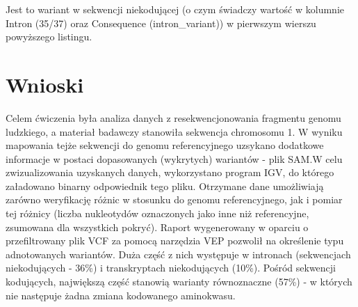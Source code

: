 \documentclass[a4paper]{article}
\begin{document}
Jest to wariant w sekwencji niekodującej (o czym świadczy wartość w kolumnie Intron (35/37) oraz Consequence (intron\_variant)) w pierwszym wierszu powyższego listingu.

\section{Wnioski}
Celem ćwiczenia była analiza danych z resekwencjonowania fragmentu genomu ludzkiego, a  materiał badawczy stanowiła sekwencja chromosomu 1. W wyniku mapowania tejże sekwencji do genomu referencyjnego uzsykano dodatkowe informacje w postaci dopasowanych (wykrytych) wariantów - plik SAM.W celu zwizualizowania uzyskanych danych, wykorzystano program IGV, do którego załadowano binarny odpowiednik tego pliku. Otrzymane dane umożliwiają zarówno weryfikację różnic w stosunku do genomu referencyjnego, jak i pomiar tej różnicy (liczba nukleotydów oznaczonych jako inne niż referencyjne, zsumowana dla wszystkich pokryć). Raport wygenerowany w oparciu o przefiltrowany plik VCF za pomocą narzędzia VEP pozwolił na określenie typu adnotowanych wariantów. Duża część z nich występuje w intronach (sekwencjach niekodujących - 36\%) i transkryptach niekodujących (10\%). Pośród sekwencji kodujących, największą część stanowią warianty równoznaczne (57\%) - w których nie następuje żadna zmiana kodowanego aminokwasu.
\end{document}
